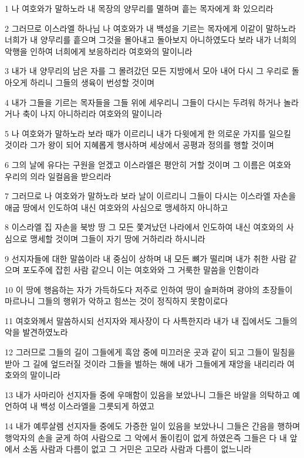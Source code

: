 \par 1 나 여호와가 말하노라 내 목장의 양무리를 멸하며 흩는 목자에게 화 있으리라
\par 2 그러므로 이스라엘 하나님 나 여호와가 내 백성을 기르는 목자에게 이같이 말하노라 너희가 내 양무리를 흩으며 그것을 몰아내고 돌아보지 아니하였도다 보라 내가 너희의 악행을 인하여 너희에게 보응하리라 여호와의 말이니라
\par 3 내가 내 양무리의 남은 자를 그 몰려갔던 모든 지방에서 모아 내어 다시 그 우리로 돌아오게 하리니 그들의 생육이 번성할 것이며
\par 4 내가 그들을 기르는 목자들을 그들 위에 세우리니 그들이 다시는 두려워 하거나 놀라거나 축이 나지 아니하리라 여호와의 말이니라
\par 5 나 여호와가 말하노라 보라 때가 이르리니 내가 다윗에게 한 의로운 가지를 일으킬 것이라 그가 왕이 되어 지혜롭게 행사하며 세상에서 공평과 정의를 행할 것이며
\par 6 그의 날에 유다는 구원을 얻겠고 이스라엘은 평안히 거할 것이며 그 이름은 여호와 우리의 의라 일컬음을 받으리라
\par 7 그러므로 나 여호와가 말하노라 보라 날이 이르리니 그들이 다시는 이스라엘 자손을 애굽 땅에서 인도하여 내신 여호와의 사심으로 맹세하지 아니하고
\par 8 이스라엘 집 자손을 북방 땅 그 모든 쫓겨났던 나라에서 인도하여 내신 여호와의 사심으로 맹세할 것이며 그들이 자기 땅에 거하리라 하시니라
\par 9 선지자들에 대한 말씀이라 내 중심이 상하며 내 모든 뼈가 떨리며 내가 취한 사람 같으며 포도주에 잡힌 사람 같으니 이는 여호와와 그 거룩한 말씀을 인함이라
\par 10 이 땅에 행음하는 자가 가득하도다 저주로 인하여 땅이 슬퍼하며 광야의 초장들이 마르나니 그들의 행위가 악하고 힘쓰는 것이 정직하지 못함이로다
\par 11 여호와께서 말씀하시되 선지자와 제사장이 다 사특한지라 내가 내 집에서도 그들의 악을 발견하였노라
\par 12 그러므로 그들의 길이 그들에게 흑암 중에 미끄러운 곳과 같이 되고 그들이 밀침을 받아 그 길에 엎드러질 것이라 그들을 벌하는 해에 내가 그들에게 재앙을 내리리라 여호와의 말이니라
\par 13 내가 사마리아 선지자들 중에 우매함이 있음을 보았나니 그들은 바알을 의탁하고 예언하여 내 백성 이스라엘을 그릇되게 하였고
\par 14 내가 예루살렘 선지자들 중에도 가증한 일이 있음을 보았나니 그들은 간음을 행하며 행악자의 손을 굳게 하여 사람으로 그 악에서 돌이킴이 없게 하였은즉 그들은 다 내 앞에서 소돔 사람과 다름이 없고 그 거민은 고모라 사람과 다름이 없느니라
